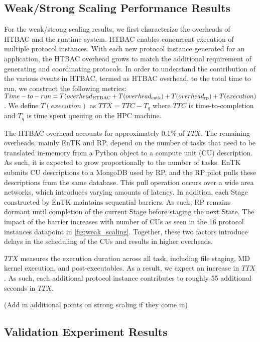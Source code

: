 \subsection{Weak/Strong Scaling Performance Results}

For the weak/strong scaling results, we first characterize the overheads of HTBAC and
the runtime system. HTBAC enables concurrent execution of multiple protocol instances.
With each new protocol instance generated for an
application, the HTBAC overhead grows to match the additional
requirement of generating and coordinating protocols. In order
to understand the contribution of the various events in HTBAC,
termed as HTBAC overhead, to the total time to run, we construct the following metrics:
\(Time-to-run = T(overhead\textsubscript{HTBAC} +
T(overhead\textsubscript{entk}) +
T(overhead\textsubscript{rp}) + T(execution)\). We define \(T(execution)\) as \(TTX = TTC - T_q\) where \(TTC\) is
time-to-completion and \(T_q\) is time spent queuing on the HPC machine.

The HTBAC overhead accounts for approximately 0.1\% of \(TTX\).
The remaining overheads, mainly EnTK and RP, depend on the number of tasks that need to be
translated in-memory from a Python object to a compute unit (CU) description. As such, it is
expected to grow proportionally to the number of tasks. EnTK submits CU descriptions to a
MongoDB used by RP, and the RP pilot pulls these descriptions from the same database.
This pull operation occurs over a wide area networks, which introduces varying amounts of latency.
In addition, each Stage constructed by EnTK maintains sequential barriers. As such, RP remains
dormant until completion of the current Stage before staging the next State. The impact of the 
barrier increases with number of CUs as seen in the 16 protocol instances datapoint 
in \ref{fig:weak_scaling}. 
Together, these two factors introduce delays in the scheduling of the CUs and results in 
higher overheads. 

 \(TTX\) measures the execution duration across all task, including file staging, MD kernel execution, 
 and post-executables. As a result, we expect an increase in \(TTX\). As such, each additional 
 protocol instance contributes to roughly 55 additional seconds in \(TTX\). 

 (Add in additional points on strong scaling if they come in)


\subsection{Validation Experiment Results}

